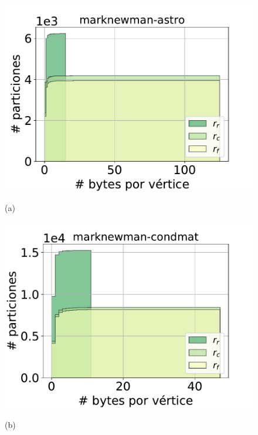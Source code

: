 \begin{figure}
    	\centering
    	\begin{minipage}{1\textwidth}
    		\centering
    		\begin{minipage}{0.45\textwidth}
    			\centering
    			\includegraphics[width=1\linewidth]{img/cdf/marknewman-astro.pdf}
    			
    			(a)
    		\end{minipage}
    		\begin{minipage}{0.45\textwidth}
    			\centering
    			\includegraphics[width=1\linewidth]{img/cdf/marknewman-condmat.pdf}
    			
    			(b)
    		\end{minipage}  		
    	\end{minipage}
    	

\end{figure}
